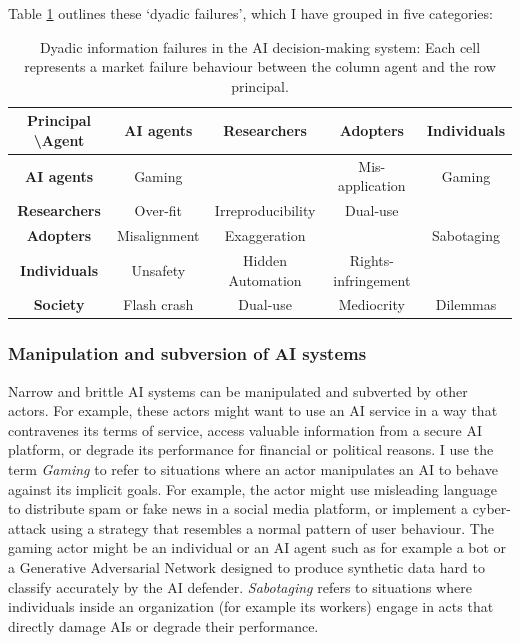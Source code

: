 \documentclass[11pt]{article}
\begin{document}
Table \ref{tab:info_failures} outlines these `dyadic failures', which I have grouped in five categories:

\begin{table}[h!]
    \centering
    \renewcommand{\arraystretch}{1.5} 
    \begin{tabular}[width=\linewidth]{c c c c c}
    \textbf{Principal \textbackslash  Agent} & \textbf{AI agents} & \textbf{Researchers} & \textbf{Adopters} & \textbf{Individuals} \\
    \hline
    \textbf{AI agents} & Gaming & & Mis-application & Gaming \\ 
    \textbf{Researchers} & Over-fit & Irreproducibility & Dual-use & \\
    \textbf{Adopters} & Misalignment & Exaggeration &  & Sabotaging \\
    \textbf{Individuals} & Unsafety & Hidden Automation & Rights-infringement & \\
    \textbf{Society} & Flash crash & Dual-use & Mediocrity & Dilemmas \\
    \hline
\end{tabular}
    \caption{Dyadic information failures in the AI decision-making system: Each cell represents a market failure behaviour between the column agent and the row principal.}
    \label{tab:info_failures}
\end{table}

\subsubsection*{Manipulation and subversion of AI systems}
Narrow and brittle AI systems can be manipulated and subverted by other actors. For example, these actors might want to use an AI service in a way that contravenes its terms of service, access valuable information from a secure AI platform, or degrade its performance for financial or political reasons.  I use the term \textit{Gaming} to refer to situations where an actor manipulates an AI to behave against its implicit goals. For example, the actor might use misleading language to distribute spam or fake news in a social media platform, or implement a cyber-attack using a strategy that resembles a normal pattern of user behaviour. The gaming actor might be an individual or an AI agent such as for example a bot or a Generative Adversarial Network designed to produce synthetic data hard to classify accurately by the AI defender. \textit{Sabotaging} refers to situations where individuals inside an organization (for example its workers) engage in acts that directly damage AIs or degrade their performance. 
\end{document}
